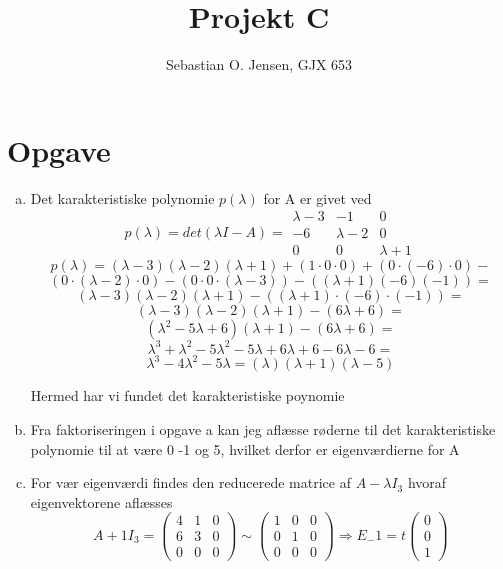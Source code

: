 \documentclass[12pt]{article}
\title{Projekt C}
\author{Sebastian O. Jensen, GJX 653}
\begin{document}
\newcommand{\aar}{
1  }
\newcommand{\ab}{
3  }
\newcommand{\ac}{
1  }
\newcommand{\ba}{
4  }
\newcommand{\bb}{
2  }
\newcommand{\bc}{
-1  }
\newcommand{\ca}{
-2  }
\newcommand{\cb}{
4 }
\newcommand{\cc}{
2  }

\maketitle
\newpage
\section{Opgave}
\begin{enumerate}[(a)]
\item 
Det karakteristiske polynomie $p(\lambda)$ for A er givet ved
$$
p(\lambda) = det(\lambda I-A) = \begin{array}{|ccc|}
\lambda-3&-1&0\\
-6&\lambda-2&0\\
0&0&\lambda+1
\end{array}
$$
$$
p(\lambda) = (\lambda-3) (\lambda-2) (\lambda+1) +
(1\cdot 0 \cdot 0)
+ (0 \cdot (-6) \cdot 0)
-
$$$$(0 \cdot (\lambda -2)  \cdot 0)
-(0 \cdot 0 \cdot (\lambda -3))
-((\lambda +1)(-6)(-1))= 
$$
$$
(\lambda-3) (\lambda-2) (\lambda+1)
-((\lambda +1) \cdot (-6)\cdot (-1))=
$$$$
(\lambda-3) (\lambda-2) (\lambda+1)
-(6\lambda +6)=
$$$$
(\lambda^2-5\lambda +6)(\lambda+1)-(6\lambda +6)=
$$
$$
\lambda^3 + \lambda^2 -5\lambda^2 -5\lambda +6\lambda + 6
-6\lambda -6= $$
$$
\lambda^3 -4\lambda^2 -5\lambda
= (\lambda)(\lambda+1)(\lambda-5) $$

Hermed har vi fundet det karakteristiske poynomie
\item
Fra faktoriseringen i opgave a kan jeg aflæsse røderne til det karakteristiske
polynomie til at være 0 -1 og 5, hvilket derfor er eigenværdierne for A

\item 
For vær eigenværdi findes den reducerede matrice af $A-\lambda I_3$ hvoraf
eigenvektorene aflæsses $$
A+1I_3 = \left(\begin{array}{ccc}
4&1&0\\
6&3&0\\
0&0&0
\end{array}\right)\sim
\left(\begin{array}{ccc}
1&0&0\\
0&1&0\\
0&0&0
\end{array}\right) \Rightarrow E_-1 = t
\left(\begin{array}{ccc}
0\\
0\\
1
\end{array}\right)
$$


\end{enumerate}
\end{document}
